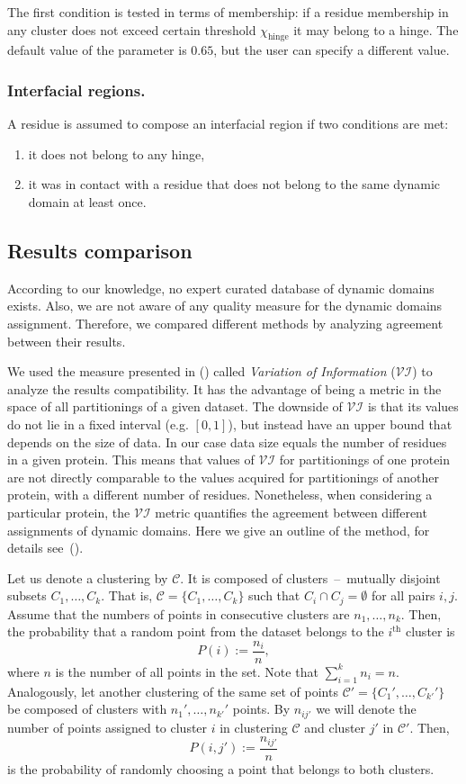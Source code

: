 The first condition is tested in terms of membership: if a residue membership in any cluster does not exceed certain threshold $\chi_\text{hinge}$ it may belong to a hinge. 
The default value of the parameter is $0.65$, but the user can specify a different value.

\subsubsection*{Interfacial regions.}
A residue is assumed to compose an interfacial region if two conditions are met:
\begin{enumerate}
\item it does not belong to any hinge,
\item it was in contact with a residue that does not belong to the same dynamic domain at least once.
\end{enumerate}

\subsection*{Results comparison}
According to our knowledge, no expert curated database of dynamic domains exists.
Also, we are not aware of any quality measure for the dynamic domains assignment.
Therefore, we compared different methods by analyzing agreement between their results.

We used the measure presented in (\cite{meilua2007comparing}) called \emph{Variation of Information} ($\mathcal{VI}$) to analyze the results compatibility.
It has the advantage of being a metric in the space of all partitionings of a given dataset.
The downside of $\mathcal{VI}$ is that its values do not lie in a fixed interval (e.g. $[0,1]$), but instead have an upper bound that depends on the size of data.
In our case data size equals the number of residues in a given protein.
This means that values of $\mathcal{VI}$ for partitionings of one protein are not directly comparable to the values acquired for partitionings of another protein, with a different number of residues.
Nonetheless, when considering a particular protein, the $\mathcal{VI}$ metric quantifies the agreement between different assignments of dynamic domains.
Here we give an outline of the method, for details see~(\cite{meilua2007comparing}).

Let us denote a clustering by $\mathcal{C}$.
It is composed of clusters~--~mutually disjoint subsets $C_1,\ldots,C_k$.
That is, $\mathcal{C} = \{ C_1,\ldots,C_k\}$ such that \mbox{$C_i \cap C_j = \emptyset$} for all pairs $i,j$.
Assume that the numbers of points in consecutive clusters are $n_1,\ldots,n_k$.
Then, the probability that a random point from the dataset belongs to the $i^{\textrm{th}}$ cluster is $$P(i):=\frac{n_i}{n},$$ where $n$ is the number of all points in the set.
Note that $\sum_{i=1}^k n_i = n$.
Analogously, let another clustering of the same set of points $\mathcal{C'}=\{ C_1',\ldots,C_{k'}' \}$ be composed of clusters with $n_1',\ldots,n_{k'}'$ points.
By $n_{ij'}$ we will denote the number of points assigned to cluster $i$ in clustering $\mathcal{C}$ and cluster $j'$ in $\mathcal{C'}$.
Then, $$P(i,j'):=\frac{n_{ij'}}{n} $$ is the probability of randomly choosing a point that belongs to both clusters.

